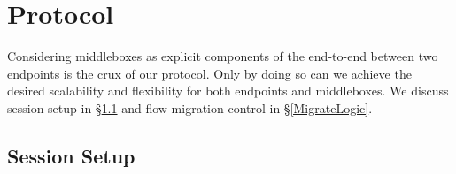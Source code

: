 \section{Protocol}
\label{sec:protocol}

Considering middleboxes as explicit components of the end-to-end between two endpoints is the crux of our protocol. Only by doing so can we achieve the desired scalability and flexibility for both endpoints and middleboxes. We discuss session setup in \S\ref{setup} and flow migration control in \S\ref{MigrateLogic}.  

\subsection{Session Setup}\label{setup}


